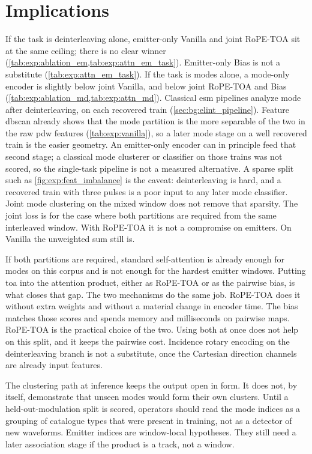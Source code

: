 \section{Implications}\label{sec:disc:implications}

If the task is deinterleaving alone, emitter-only Vanilla and joint RoPE-TOA sit at the same ceiling; there is no clear winner (\cref{tab:exp:ablation_em,tab:exp:attn_em_task}).
Emitter-only Bias is not a substitute (\cref{tab:exp:attn_em_task}).
If the task is modes alone, a mode-only encoder is slightly below joint Vanilla, and below joint RoPE-TOA and Bias (\cref{tab:exp:ablation_md,tab:exp:attn_md}).
Classical \gls{esm} pipelines analyze mode after deinterleaving, on each recovered train (\cref{sec:bg:elint_pipeline}).
Feature \gls{dbscan} already shows that the mode partition is the more separable of the two in the raw \gls{pdw} features (\cref{tab:exp:vanilla}), so a later mode stage on a well recovered train is the easier geometry.
An emitter-only encoder can in principle feed that second stage; a classical mode clusterer or classifier on those trains was not scored, so the single-task pipeline is not a measured alternative.
A sparse split such as \cref{fig:exp:feat_imbalance} is the caveat: deinterleaving is hard, and a recovered train with three pulses is a poor input to any later mode classifier.
Joint mode clustering on the mixed window does not remove that sparsity.
The joint loss is for the case where both partitions are required from the same interleaved window.
With RoPE-TOA it is not a compromise on emitters.
On Vanilla the unweighted sum still is.

If both partitions are required, standard self-attention is already enough for modes on this corpus and is not enough for the hardest emitter windows.
Putting \gls{toa} into the attention product, either as RoPE-TOA or as the pairwise bias, is what closes that gap.
The two mechanisms do the same job.
RoPE-TOA does it without extra weights and without a material change in encoder time.
The bias matches those scores and spends memory and milliseconds on pairwise maps.
RoPE-TOA is the practical choice of the two.
Using both at once does not help on this split, and it keeps the pairwise cost.
Incidence rotary encoding on the deinterleaving branch is not a substitute, once the Cartesian direction channels are already input features.

The clustering path at inference keeps the output open in form.
It does not, by itself, demonstrate that unseen modes would form their own clusters.
Until a held-out-modulation split is scored, operators should read the mode indices as a grouping of catalogue types that were present in training, not as a detector of new waveforms.
Emitter indices are window-local hypotheses. They still need a later association stage if the product is a track, not a window.

